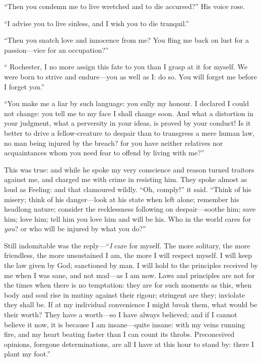 \enquote{Then you condemn me to live wretched and to die accursed?} His
voice rose.

\enquote{I advise you to live sinless, and I wish you to die tranquil.}

\enquote{Then you snatch love and innocence from me? You fling me back
on lust for a passion---vice for an occupation?}

\enquote{\Mr{} Rochester, I no more assign this fate to you than I grasp
at it for myself. We were born to strive and endure---you as well as I:
do so. You will forget me before I forget you.}

\enquote{You make me a liar by such language: you sully my honour. I
declared I could not change: you tell me to my face I shall change
soon. And what a distortion in your judgment, what a perversity in your
ideas, is proved by your conduct! Is it better to drive a
fellow-creature to despair than to transgress a mere human law, no man
being injured by the breach? for you have neither relatives nor
acquaintances whom you need fear to offend by living with me?}

This was true: and while he spoke my very conscience and reason turned
traitors against me, and charged me with crime in resisting him. They
spoke almost as loud as Feeling: and that clamoured wildly. 
\enquote{Oh, comply!} it said. \enquote{Think of his misery; think of his
danger---look at his state when left alone; remember his headlong
nature; consider the recklessness following on despair---soothe him;
save him; love him; tell him you love him and will be his. Who in the
world cares for \emph{you}? or who will be injured by what you do?}

Still indomitable was the reply---\enquote{\emph{I} care for myself. The more
solitary, the more friendless, the more unsustained I am, the more I
will respect myself. I will keep the law given by God; sanctioned by
man. I will hold to the principles received by me when I was sane, and
not mad---as I am now. Laws and principles are not for the times when
there is no temptation: they are for such moments as this, when body and
soul rise in mutiny against their rigour; stringent are they; inviolate
they shall be. If at my individual convenience I might break them, what
would be their worth? They have a worth---so I have always believed;
and if I cannot believe it now, it is because I am insane---quite
insane: with my veins running fire, and my heart beating faster than I
can count its throbs. Preconceived opinions, foregone determinations,
are all I have at this hour to stand by: there I plant my foot.}

